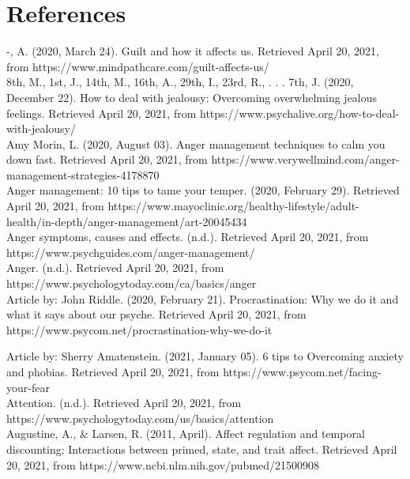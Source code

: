 \documentclass{article}
\begin{document}
    \section{References}
    -, A. (2020, March 24). Guilt and how it affects us. Retrieved April 20, 2021, from https://www.mindpathcare.com/guilt-affects-us/ \\

    8th, M., 1st, J., 14th, M., 16th, A., 29th, I., 23rd, R., . . . 7th, J. (2020, December 22). How to deal with jealousy:
    Overcoming overwhelming jealous feelings. Retrieved April 20, 2021, from https://www.psychalive.org/how-to-deal-with-jealousy/\\

    Amy Morin, L. (2020, August 03). Anger management techniques to calm you down fast. Retrieved April 20, 2021, from https://www.verywellmind.com/anger-management-strategies-4178870\\

    Anger management: 10 tips to tame your temper. (2020, February 29). Retrieved April 20, 2021, from https://www.mayoclinic.org/healthy-lifestyle/adult-health/in-depth/anger-management/art-20045434 \\

    Anger symptoms, causes and effects. (n.d.). Retrieved April 20, 2021, from https://www.psychguides.com/anger-management/ \\

    Anger. (n.d.). Retrieved April 20, 2021, from \\https://www.psychologytoday.com/ca/basics/anger \\

    Article by: John Riddle. (2020, February 21). Procrastination: Why we do it and what it says about our psyche. Retrieved April 20, 2021, from https://www.psycom.net/procrastination-why-we-do-it

    Article by: Sherry Amatenstein. (2021, January 05). 6 tips to Overcoming anxiety and phobias. Retrieved April 20, 2021, from https://www.psycom.net/facing-your-fear \\

    Attention. (n.d.). Retrieved April 20, 2021, from\\
    https://www.psychologytoday.com/us/basics/attention \\

    Augustine, A., & Larsen, R. (2011, April). Affect regulation and temporal discounting: Interactions between primed, state, and trait affect. Retrieved April 20, 2021, from https://www.ncbi.nlm.nih.gov/pubmed/21500908 \\
\end{document}
